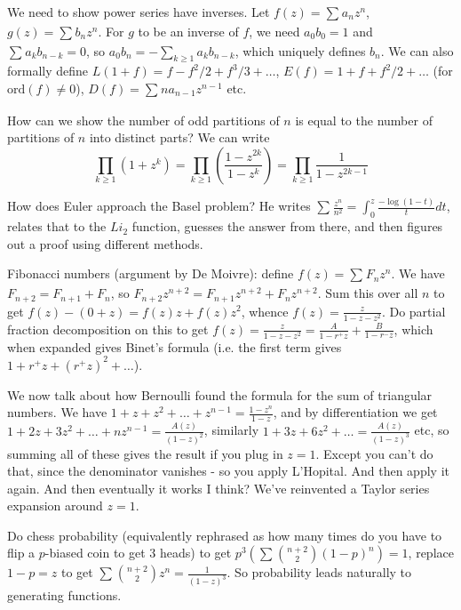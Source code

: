 \documentclass{article}
\theoremstyle{definition}
\begin{document}
We need to show power series have inverses. Let $f(z) = \sum_{}^{} a_nz^{n}$, $g(z) = \sum_{}^{} b_n z^n$. For $g$ to be an inverse of $f$, we need $a_0b_0 = 1$ and $\sum_{}^{} a_kb_{n-k} = 0$, so $a_0b_n = -\sum_{k\ge 1}^{} a_kb_{n-k}$, which uniquely defines $b_n$. We can also formally define $L(1+f) = f - f^2/2 + f^3/3 + \ldots$, $E(f) = 1 +f + f^2/2 + \ldots$ (for $\text{ord}(f)\neq 0$), $D(f) = \sum_{}^{} n a_{n-1}z^{n-1}$ etc.
\vspace{1mm}

How can we show the number of odd partitions of $n$ is equal to the number of partitions of $n$ into distinct parts? We can write \[
\prod_{k\ge 1} (1+z^k) = \prod_{k\ge 1}^{} \left(\frac{1-z^{2k}}{1-z^k}\right) = \prod_{k \ge 1}^{}  \frac{1}{1-z^{2k-1}}
\]

How does Euler approach the Basel problem? He writes $\sum_{}^{} \frac{z^n}{n^2} = \int_{0}^{z} \frac{-\log(1-t)}{t} dt$, relates that to the $Li_2$ function, guesses the answer from there, and then figures out a proof using different methods.
\vspace{1mm}

Fibonacci numbers (argument by De Moivre): define $f(z) = \sum_{}^{} F_n z^n$. We have $F_{n+2} = F_{n+1} + F_n$, so $F_{n+2}z^{n+2} = F_{n+1}z^{n+2}+ F_n z^{n+2}$. Sum this over all $n$ to get $f(z) - (0+z) = f(z)z + f(z)z^2$, whence $f(z) = \frac{z}{1-z-z^2}$. Do partial fraction decomposition on this to get $f(z)=\frac{z}{1-z-z^2} = \frac{A}{1- r^+ z} + \frac{B}{1 - r^- z}$, which when expanded gives Binet's formula (i.e. the first term gives $1+r^+ z + (r^+ z)^2 + \ldots$).  

We now talk about how Bernoulli found the formula for the sum of triangular numbers. We have $1 + z + z^2 + \ldots + z^{n-1} = \frac{1-z^n}{1-z}$, and by differentiation we get $1 + 2z + 3z^2 + \ldots + nz^{n-1} = \frac{A(z)}{(1-z)^2}$, similarly $1 + 3z +6z^2 + \ldots = \frac{A(z)}{(1-z)^3}$ etc, so summing all of these gives the result if you plug in $z=1$. Except you can't do that, since the denominator vanishes - so you apply L'Hopital. And then apply it again. And then eventually it works I think? We've reinvented a Taylor series expansion around $z=1$.

Do chess probability (equivalently rephrased as how many times do you have to flip a $p$-biased coin to get 3 heads) to get $p^3 (\sum_{}^{} {{n+2} \choose {2}} (1-p)^n) = 1$, replace $1-p = z$ to get $\sum_{}^{} {{n+2} \choose 2} z^n = \frac{1}{(1-z)^3}$. So probability leads naturally to generating functions.
\end{document}
